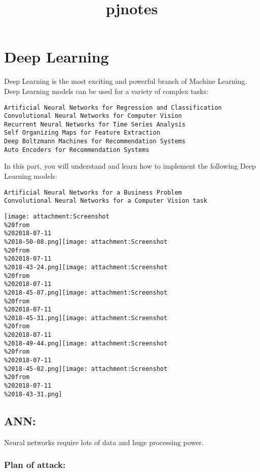 \documentclass[11pt]{article}
\title{pjnotes}
\makeatletter
\def\maxwidth{\ifdim\Gin@nat@width>\linewidth\linewidth
    \else\Gin@nat@width\fi}
\let\Oldincludegraphics\includegraphics
\renewcommand{\includegraphics}[1]{\Oldincludegraphics[width=.8\maxwidth]{#1}}
\makeatother
\begin{document}
    
    
    \maketitle
    
    

    
    \hypertarget{deep-learning}{%
\section{Deep Learning}\label{deep-learning}}

Deep Learning is the most exciting and powerful branch of Machine
Learning. Deep Learning models can be used for a variety of complex
tasks:

\begin{verbatim}
Artificial Neural Networks for Regression and Classification
Convolutional Neural Networks for Computer Vision
Recurrent Neural Networks for Time Series Analysis
Self Organizing Maps for Feature Extraction
Deep Boltzmann Machines for Recommendation Systems
Auto Encoders for Recommendation Systems
\end{verbatim}

In this part, you will understand and learn how to implement the
following Deep Learning models:

\begin{verbatim}
Artificial Neural Networks for a Business Problem
Convolutional Neural Networks for a Computer Vision task
\end{verbatim}

\texttt{[image: attachment:Screenshot\\\%20from\\\%202018-07-11\\\%2018-50-08.png]}\texttt{[image: attachment:Screenshot\\\%20from\\\%202018-07-11\\\%2018-43-24.png]}\texttt{[image: attachment:Screenshot\\\%20from\\\%202018-07-11\\\%2018-45-07.png]}\texttt{[image: attachment:Screenshot\\\%20from\\\%202018-07-11\\\%2018-45-31.png]}\texttt{[image: attachment:Screenshot\\\%20from\\\%202018-07-11\\\%2018-49-44.png]}\texttt{[image: attachment:Screenshot\\\%20from\\\%202018-07-11\\\%2018-45-02.png]}\texttt{[image: attachment:Screenshot\\\%20from\\\%202018-07-11\\\%2018-43-31.png]}

    \hypertarget{ann}{%
\subsection{ANN:}\label{ann}}

Neural networks require lots of data and huge processing power.

\hypertarget{plan-of-attack}{%
\subsubsection{Plan of attack:}\label{plan-of-attack}}
\end{document}
